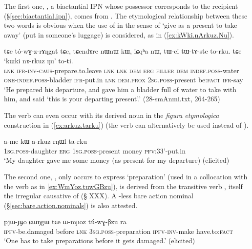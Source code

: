 The first one, , a biactantial IPN whose possessor corresponds to the recipient (§\ref{sec:biactantial.ipn}), comes from . The etymological relationship  between these two words is obvious when the use of   in the sense of `give as a present to take away' (put in someone's luggage) is considered, as in (\ref{ex:kWki.nArkuz.Nu}).

\begin{exe}
\ex \label{ex:kWki.nArkuz.Nu}
\gll tɕe tó-wɣ-z-rɤŋgat tɕe, tɕendɤre nɯnɯ kɯ, iɕqʰa nɯ,  tɯ-ci tɯ-tɤ-ste to-rku. tɕe `kɯki nɤ-rkuz ŋu' to-ti. \\
\textsc{lnk} \textsc{ifr}-\textsc{inv}-\textsc{caus}-prepare.to.leave \textsc{lnk} \textsc{lnk} \textsc{dem} \textsc{erg} \textsc{filler} \textsc{dem} \textsc{indef}.\textsc{poss}-water \textsc{one}-\textsc{indef}.\textsc{poss}-bladder \textsc{ifr}-put.in \textsc{lnk} \textsc{dem}.\textsc{prox} \textsc{2sg}.\textsc{poss}-present be:\textsc{fact} \textsc{ifr}-say \\
\glt `He prepared his departure, and gave him a bladder full of water to take with him, and said `this is your departing present'.' (28-smAnmi.txt, 264-265)
\end{exe}


The verb  can even occur with its derived noun  in the \textit{figura etymologica} construction in (\ref{ex:arkuz.tarku}) (the verb  can alternatively be used instead of ).

\begin{exe}
\ex \label{ex:arkuz.tarku}
\gll a-me kɯ a-rkuz rŋɯl ta-rku \\
\textsc{1sg}.\textsc{poss}-daughter \textsc{erg} \textsc{1sg}.\textsc{poss}-present money \textsc{pfv}:3\fl{}3'-put.in \\
\glt `My daughter gave me some money (as present for my departure) (elicited)
\end{exe}

The second one, , only occurs to express `preparation' (used in a collocation with the verb  as in \ref{ex:WmYoz.tuwGBzu}), is derived from the transitive verb , itself the irregular causative of  (§ XXX). A -less bare action nominal  (§\ref{sec:bare.action.nominals}) is also attested.

\begin{exe}
\ex \label{ex:WmYoz.tuwGBzu}
\gll  pjɯ-ɲɟo ɕɯŋgɯ tɕe ɯ-mɲoz tú-wɣ-βzu ra \\
\textsc{ipfv}-be.damaged before \textsc{lnk} \textsc{3sg}.\textsc{poss}-preparation \textsc{ipfv}-\textsc{inv}-make have.to:\textsc{fact} \\
\glt `One has to take preparations before it gets damaged.' (elicited)
\end{exe}


